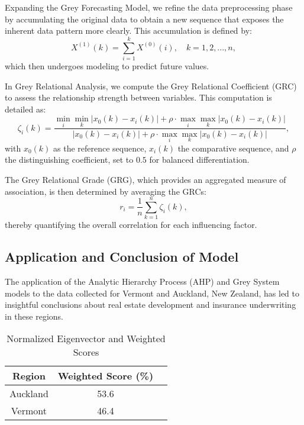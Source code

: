 \documentclass{mcmthesis}
\begin{document}
Expanding the Grey Forecasting Model, we refine the data preprocessing phase by accumulating the original data to obtain a new sequence that exposes the inherent data pattern more clearly. This accumulation is defined by:
\begin{equation}
X^{(1)}(k) = \sum_{i=1}^{k}X^{(0)}(i), \quad k = 1, 2, ..., n,
\end{equation}
which then undergoes modeling to predict future values.

In Grey Relational Analysis, we compute the Grey Relational Coefficient (GRC) to assess the relationship strength between variables. This computation is detailed as:
\begin{equation}
\zeta_i(k) = \frac{\min_{i}\min_{k} |x_0(k) - x_i(k)| + \rho \cdot \max_{i}\max_{k} |x_0(k) - x_i(k)|}{|x_0(k) - x_i(k)| + \rho \cdot \max_{i}\max_{k} |x_0(k) - x_i(k)|},
\end{equation}
with $x_0(k)$ as the reference sequence, $x_i(k)$ the comparative sequence, and $\rho$ the distinguishing coefficient, set to $0.5$ for balanced differentiation.

The Grey Relational Grade (GRG), which provides an aggregated measure of association, is then determined by averaging the GRCs:
\begin{equation}
r_i = \frac{1}{n} \sum_{k=1}^{n} \zeta_i(k),
\end{equation}
thereby quantifying the overall correlation for each influencing factor.

\subsection{Application and Conclusion of Model}

The application of the Analytic Hierarchy Process (AHP) and Grey System models to the data collected for Vermont and Auckland, New Zealand, has led to insightful conclusions about real estate development and insurance underwriting in these regions.

\begin{table}[h]
\centering
\caption{Normalized Eigenvector and Weighted Scores}
\label{table:weighted_scores}
\begin{tabular}{|c|c|c|}
\hline
\textbf{Region} & \textbf{Weighted Score (\%)} \\
\hline
Auckland & 53.6 \\
\hline
Vermont & 46.4 \\
\hline
\end{tabular}
\end{table}
\end{document}
